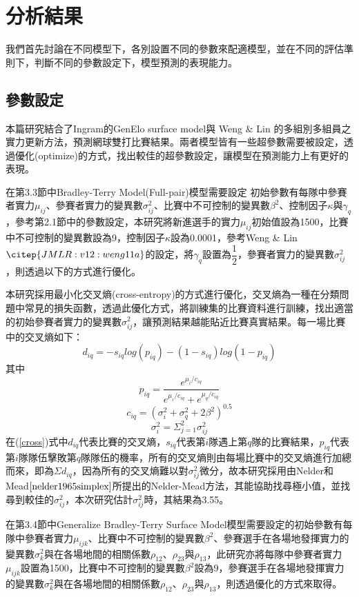 \documentclass[12pt]{article}
\begin{document}
\section{分析結果}

我們首先討論在不同模型下，各別設置不同的參數來配適模型，並在不同的評估準則下，判斷不同的參數設定下，模型預測的表現能力。

\subsection{參數設定}

本篇研究結合了Ingram\cite{Ingram+2021}的GenElo surface model與 Weng \& Lin \cite{JMLR:v12:weng11a}的多組別多組員之實力更新方法，預測網球雙打比賽結果。兩者模型皆有一些超參數需要被設定，透過優化(optimize)的方式，找出較佳的超參數設定，讓模型在預測能力上有更好的表現。

在第3.3節中Bradley-Terry Model(Full-pair)模型需要設定
初始參數有每隊中參賽者實力$\mu_{ij}$、參賽者實力的變異數$\sigma^2_{ij}$、比賽中不可控制的變異數$\beta^2$、控制因子$\kappa$與$\gamma_q$，參考第2.1節中的參數設定，本研究將新進選手的實力$\mu_{ij}$初始值設為1500，比賽中不可控制的變異數設為9，控制因子$\kappa$設為0.0001，參考Weng \& Lin$\citep{JMLR:v12:weng11a}$的設定，將$\gamma_q$設置為$\dfrac{1}{2}$，參賽者實力的變異數$\sigma^2_{ij}$，則透過以下的方式進行優化。

本研究採用最小化交叉熵(cross-entropy)的方式進行優化，交叉熵為一種在分類問題中常見的損失函數，透過此優化方式，將訓練集的比賽資料進行訓練，找出適當的初始參賽者實力的變異數$\sigma^2_{ij}$，讓預測結果越能貼近比賽真實結果。每一場比賽中的交叉熵如下：
\begin{equation}
d_{iq}= -s_{iq}log(p_{iq})-(1-s_{iq})log(1-p_{iq})\label{cross}
\end{equation}
其中
\[
p_{iq} = \dfrac{e^{\mu_i/c_{iq}}}{e^{\mu_i/c_{iq}} +e^{\mu_q/c_{iq}}}
\]
\[
c_{iq} = (\sigma^2_i+\sigma^2_q + 2\beta^2)^{0.5}
\]
\[
\sigma^2_{i} = \Sigma_{j=1}^2\sigma^2_{ij}
\]
在(\ref{cross})式中$d_{iq}$代表比賽的交叉熵，$s_{iq}$代表第$i$隊遇上第$q$隊的比賽結果，$p_{iq}$代表第$i$隊隊伍擊敗第$q$隊隊伍的機率，所有的交叉熵則由每場比賽中的交叉熵進行加總而來，即為$\Sigma{d_{iq}}$，因為所有的交叉熵難以對$\sigma^2_{ij}$微分，故本研究採用由Nelder和Mead$\cite{nelder1965simplex}$所提出的Nelder-Mead方法，其能協助找尋極小值，並找尋到較佳的$\sigma^2_{ij}$，本次研究估計$\sigma^2_{ij}$時，其結果為3.55。

在第3.4節中Generalize Bradley-Terry Surface Model模型需要設定的初始參數有每隊中參賽者實力$\mu_{ijk}$、比賽中不可控制的變異數$\beta^2$、參賽選手在各場地發揮實力的變異數$\sigma^2_k$與在各場地間的相關係數$\rho_{12}$、$\rho_{23}$與$\rho_{13}$，此研究亦將每隊中參賽者實力$\mu_{ijk}$設置為1500，比賽中不可控制的變異數$\beta^2$設為9，參賽選手在各場地發揮實力的變異數$\sigma^2_k$與在各場地間的相關係數$\rho_{12}$、$\rho_{23}$與$\rho_{13}$，則透過優化的方式來取得。
\end{document}
